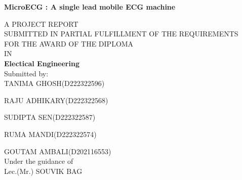 \documentclass[12pt,a4paper]{report}
\begin{document}
\begin{center}
{\Large \textbf{MicroECG : A single lead mobile ECG machine}}\\
\vspace{0.5cm}

A PROJECT REPORT\\
SUBMITTED IN PARTIAL FULFILLMENT OF THE REQUIREMENTS\\
FOR THE AWARD OF THE DIPLOMA\\
IN\\
\textbf{Electical Engineering} \\
\vspace{1 cm}
Submitted by: \\

TANIMA GHOSH(D222322596)\\
\vspace{0.2cm}

RAJU ADHIKARY(D222322568)\\
\vspace{0.2cm}

SUDIPTA SEN(D222322587)\\
\vspace{0.2cm}

RUMA MANDI(D222322574)\\
\vspace{0.2cm}

GOUTAM AMBALI(D202116553)\\
\vspace{0.2cm}
\vspace{1 cm}
Under the guidance of\\

Lec.(Mr.) SOUVIK BAG\\

\end{center}
\end{document}
